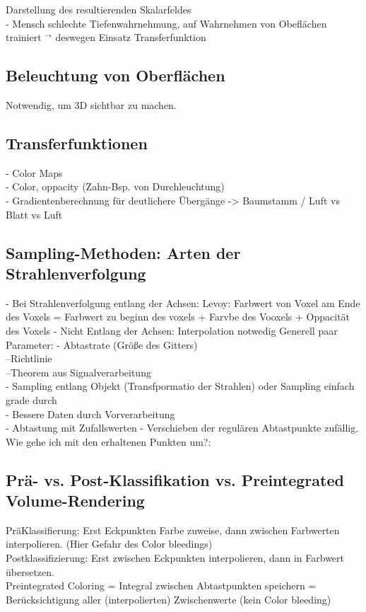 \documentclass{article}
\begin{document}
\noindent Darstellung des resultierenden Skalarfeldes\\
- Mensch schlechte Tiefenwahrnehmung, auf Wahrnehmen von Obeflächen trainiert $^\rightarrow$ deswegen Einsatz Transferfunktion

\subsection{Beleuchtung von Oberflächen}
Notwendig, um 3D sichtbar zu machen.\\

\subsection{Transferfunktionen}
- Color Maps\\
- Color, oppacity (Zahn-Bsp. von Durchleuchtung)\\
- Gradientenberechnung für deutlichere Übergänge -> Baumstamm / Luft vs Blatt vs Luft

\subsection{Sampling-Methoden: Arten der Strahlenverfolgung}
- Bei Strahlenverfolgung entlang der Achsen: Levoy: Farbwert von Voxel am Ende des Voxels = Farbwert zu beginn des voxels + Farvbe des Vooxels + Oppacität des Voxels
- Nicht Entlang der Achsen: Interpolation notwedig
Generell paar Parameter:
- Abtastrate  (Größe des Gitters)\\
--Richtlinie\\
--Theorem aus Signalverarbeitung\\
- Sampling entlang Objekt (Transfpormatio der Strahlen) oder Sampling einfach grade durch\\
- Bessere Daten durch Vorverarbeitung\\
- Abtastung mit Zufallswerten - Verschieben der regulären Abtastpunkte zufällig.\\

Wie gehe ich mit den erhaltenen Punkten um?:

\subsection{Prä- vs. Post-Klassifikation vs. Preintegrated Volume-Rendering}
PräKlassifierung: Erst Eckpunkten Farbe zuweise, dann zwischen Farbwerten interpolieren. (Hier Gefahr des Color bleedings)\\
Postklassifizierung: Erst zwischen Eckpunkten interpolieren, dann in Farbwert übersetzen.\\
Preintegrated Coloring = Integral zwischen Abtastpunkten speichern = Berücksichtigung aller (interpolierten) Zwischenwerte  (kein Color bleeding) \\
\end{document}
